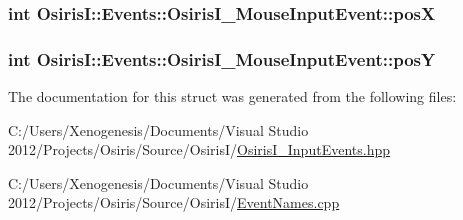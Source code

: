 \hypertarget{struct_osiris_i_1_1_events_1_1_osiris_i___mouse_input_event_a6bb12656332b418e6dc01faec54b20f5}{
\subsubsection[{pos\-X}]{\setlength{\rightskip}{0pt plus 5cm}int Osiris\-I\-::\-Events\-::\-Osiris\-I\-\_\-\-Mouse\-Input\-Event\-::pos\-X\hspace{0.3cm}{\ttfamily [protected]}}}\label{struct_osiris_i_1_1_events_1_1_osiris_i___mouse_input_event_a6bb12656332b418e6dc01faec54b20f5}
\hypertarget{struct_osiris_i_1_1_events_1_1_osiris_i___mouse_input_event_accc04535d428763c593b2abcd34bebdd}{
\subsubsection[{pos\-Y}]{\setlength{\rightskip}{0pt plus 5cm}int Osiris\-I\-::\-Events\-::\-Osiris\-I\-\_\-\-Mouse\-Input\-Event\-::pos\-Y\hspace{0.3cm}{\ttfamily [protected]}}}\label{struct_osiris_i_1_1_events_1_1_osiris_i___mouse_input_event_accc04535d428763c593b2abcd34bebdd}


The documentation for this struct was generated from the following files\-:\begin{DoxyCompactItemize}
\item 
C\-:/\-Users/\-Xenogenesis/\-Documents/\-Visual Studio 2012/\-Projects/\-Osiris/\-Source/\-Osiris\-I/\hyperlink{_osiris_i___input_events_8hpp}{Osiris\-I\-\_\-\-Input\-Events.\-hpp}\item 
C\-:/\-Users/\-Xenogenesis/\-Documents/\-Visual Studio 2012/\-Projects/\-Osiris/\-Source/\-Osiris\-I/\hyperlink{_event_names_8cpp}{Event\-Names.\-cpp}\end{DoxyCompactItemize}
